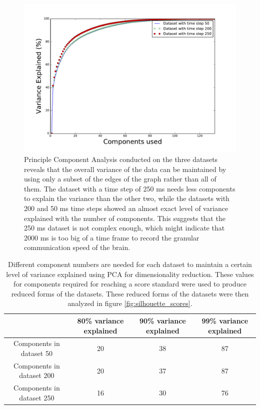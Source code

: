 \documentclass[journal,12pt,onecolumn,draftclsnofoot]{IEEEtran}  %
\begin{document}
\begin{figure}[H]
  \centering
  \includegraphics[width=0.55\linewidth]{figures/variance_explained_with_pca.pdf}
  \caption{Principle Component Analysis conducted on the three datasets reveals that the overall variance of the data can be maintained by using only a subset of the edges of the graph rather than all of them. The dataset with a time step of 250 ms needs less components to explain the variance than the other two, while the datasets with 200 and 50 ms time steps showed an almost exact level of variance explained with the number of components. This suggests that the 250 ms dataset is not complex enough, which might indicate that 2000 ms is too big of a time frame to record the granular communication speed of the brain.}
  \label{fig:pca_analysis_variance}
\end{figure}

\begin{table}[H]
\centering
\caption{Different component numbers are needed for each dataset to maintain a certain level of variance explained using PCA for dimensionality reduction. These values for components required for reaching a score standard were used to produce reduced forms of the datasets. These reduced forms of the datasets were then analyzed in figure \ref{fig:silhouette_scores}.}
\label{tab:components_needed_for_variance}
\begin{tabular}{|c|c|c|c|}
\hline
 &  80\% variance explained &  90\% variance explained & 99\% variance explained \\ \hline
 
 Components in dataset 50 & 20 &  38&  87  \\ \hline
 Components in dataset 200 & 20 &  37&  87\\ \hline
 Components in dataset 250 & 16 &  30&  76  \\ \hline
\end{tabular}
\end{table}
\end{document}
